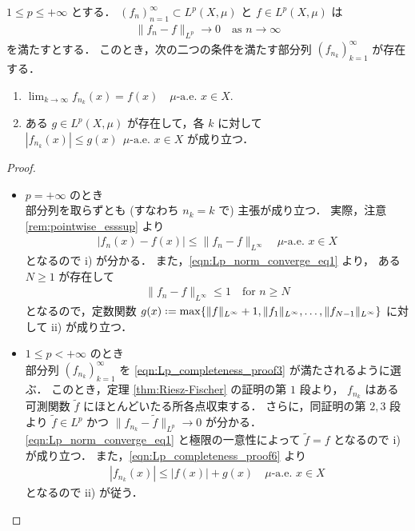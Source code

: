 \begin{theorem}
    $1\le p\le+\infty$ とする．
    $(f_n)_{n=1}^\infty\subset L^p(X,\mu)$ と $f\in L^p(X,\mu)$ は
    \begin{align}
        \|f_n-f\|_{L^p}\to0\quad\text{as $n\to\infty$}
        \label{eqn:Lp_norm_converge_eq1}
    \end{align}
    を満たすとする．
    このとき，次の二つの条件を満たす部分列 $(f_{n_k})_{k=1}^\infty$ が存在する．
    \begin{enumerate}
        \item $\displaystyle\lim_{k\to\infty}f_{n_k}(x)=f(x)\quad\text{$\mu$-a.e.\ $x\in X$}.$
        \item ある $g\in L^p(X,\mu)$ が存在して，各 $k$ に対して $|f_{n_k}(x)|\le g(x)\ \ \text{$\mu$-a.e.\ $x\in X$}$ が成り立つ．
    \end{enumerate}
\end{theorem}

\begin{proof}
    \leavevmode
    \begin{itemize}[leftmargin=\parindent]
    \item $p=+\infty$ のとき\\
        部分列を取らずとも (すなわち $n_k=k$ で) 主張が成り立つ．
        実際，注意 \ref{rem:pointwise_esssup} より
        \begin{align*}
            |f_n(x)-f(x)|\le\|f_n-f\|_{L^\infty}\quad\text{$\mu$-a.e.\ $x\in X$}
        \end{align*}
        となるので \textrm{i)} が分かる．
        また，\eqref{eqn:Lp_norm_converge_eq1} より，
        ある $N\ge1$ が存在して
        \begin{align*}
            \|f_n-f\|_{L^\infty}\le1\quad\text{for $n\ge N$}
        \end{align*}
        となるので，定数関数
        $g(x)\defeq\max\{\|f\|_{L^\infty}+1,\|f_1\|_{L^\infty},\ldots,\|f_{N-1}\|_{L^\infty}\}$
        に対して \textrm{ii)} が成り立つ．

    \item $1\le p<+\infty$ のとき\\
        部分列 $(f_{n_k})_{k=1}^\infty$ を \eqref{eqn:Lp_completeness_proof3} が満たされるように選ぶ．
        このとき，定理 \ref{thm:Riesz-Fischer} の証明の第 $1$ 段より，
        $f_{n_k}$ はある可測関数 $\widetilde f$ にほとんどいたる所各点収束する．
        さらに，同証明の第 $2,3$ 段より $\widetilde f\in L^p$ かつ $\|f_{n_k}-\widetilde f\|_{L^p}\to0$ が分かる．
        \eqref{eqn:Lp_norm_converge_eq1} と極限の一意性によって $\widetilde f=f$ となるので \textrm{i)} が成り立つ．
        また，\eqref{eqn:Lp_completeness_proof6} より
        \begin{align*}
            |f_{n_k}(x)|\le|f(x)|+g(x)\quad\text{$\mu$-a.e.\ $x\in X$}
        \end{align*}
        となるので \textrm{ii)} が従う．
    \end{itemize}
\end{proof}

